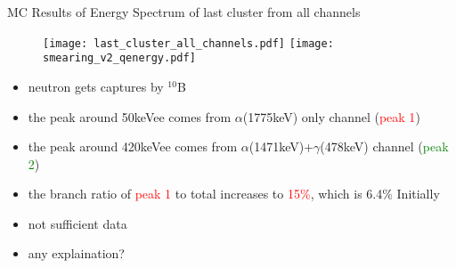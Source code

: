 \documentclass[9pt]{beamer}
\begin{document}
\begin{frame}{MC Results of Energy Spectrum of last cluster from all channels}
\begin{figure}
\texttt{[image: last\_cluster\_all\_channels.pdf]}
\texttt{[image: smearing\_v2\_qenergy.pdf]}
\end{figure}
\begin{itemize}
[bullet]
\item neutron gets captures by $^{10}$B
\item the peak around 50keVee comes from $\alpha$(1775keV) only channel (\textcolor{red}{peak 1})
\item the peak around 420keVee comes from $\alpha$(1471keV)+$\gamma$(478keV) channel (\textcolor{green}{peak 2})
\item the branch ratio of \textcolor{red}{peak 1} to total increases to \textcolor{red}{15$\%$}, which is 6.4$\%$ Initially 
\item not sufficient data
\item any explaination?
\end{itemize}
\end{frame}

\end{document}
